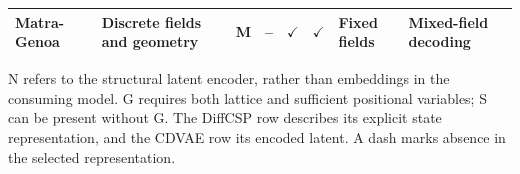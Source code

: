 \begin{table}[H]
\begin{tabularx}{\textwidth}{@{}L{0.16\textwidth}YccccL{0.17\textwidth}L{0.18\textwidth}@{}}
Matra-Genoa~\citep{debreuck2026matragenoa} & Discrete fields and geometry & M & -- & $\checkmark$ & $\checkmark$ & Fixed fields & Mixed-field decoding \\
\bottomrule
\end{tabularx}
\vspace{0.4em}
\begin{minipage}{\textwidth}\footnotesize
N refers to the structural latent encoder, rather than embeddings in the consuming model. G requires both lattice and sufficient positional variables; S can be present without G. The DiffCSP row describes its explicit state representation, and the CDVAE row its encoded latent. A dash marks absence in the selected representation.
\end{minipage}
\end{table}

